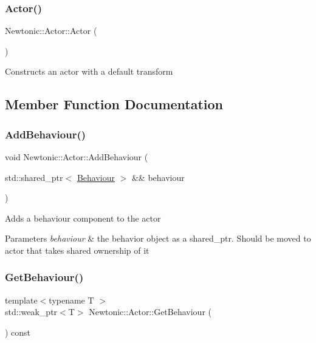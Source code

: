 \subsubsection{\texorpdfstring{Actor()}{Actor()}}
{\footnotesize\ttfamily Newtonic\+::\+Actor\+::\+Actor (\begin{DoxyParamCaption}{ }\end{DoxyParamCaption})\hspace{0.3cm}{\ttfamily [inline]}}

Constructs an actor with a default transform 

\subsection{Member Function Documentation}
\mbox{\label{classNewtonic_1_1Actor_a49529a1eeaf7ade6db2b3656fd14d956}} 
\subsubsection{\texorpdfstring{AddBehaviour()}{AddBehaviour()}}
{\footnotesize\ttfamily void Newtonic\+::\+Actor\+::\+Add\+Behaviour (\begin{DoxyParamCaption}\item[{std\+::shared\+\_\+ptr$<$ \mbox{\hyperlink{classNewtonic_1_1Behaviour}{Behaviour}} $>$ \&\&}]{behaviour }\end{DoxyParamCaption})}

Adds a behaviour component to the actor 
\begin{DoxyParams}{Parameters}
{\em behaviour} & the behavior object as a shared\+\_\+ptr. Should be moved to actor that takes shared ownership of it \\
\hline
\end{DoxyParams}
\mbox{\label{classNewtonic_1_1Actor_aaad003203edfb935f16d572f8c3e2cbc}} 
\subsubsection{\texorpdfstring{GetBehaviour()}{GetBehaviour()}}
{\footnotesize\ttfamily template$<$typename T $>$ \\
std\+::weak\+\_\+ptr$<$T$>$ Newtonic\+::\+Actor\+::\+Get\+Behaviour (\begin{DoxyParamCaption}{ }\end{DoxyParamCaption}) const\hspace{0.3cm}{\ttfamily [inline]}}

